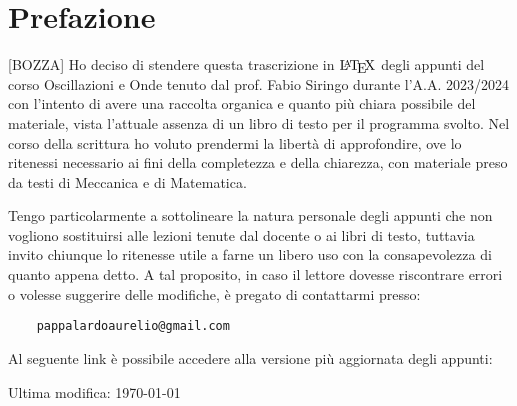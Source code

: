 \chapter*{Prefazione}\label{s:preface}
[BOZZA] Ho deciso di stendere questa trascrizione in $\text{\LaTeX}$ degli appunti del corso Oscillazioni e Onde tenuto dal prof. Fabio Siringo durante l'A.A. 2023/2024 con l'intento di avere una raccolta organica e quanto pi\`u chiara possibile del materiale, vista l'attuale assenza di un libro di testo per il programma svolto. Nel corso della scrittura ho voluto prendermi la libert\`a di approfondire, ove lo ritenessi necessario ai fini della completezza e della chiarezza, con materiale preso da testi di Meccanica e di Matematica. \par Tengo particolarmente a sottolineare la natura personale degli appunti che non vogliono sostituirsi alle lezioni tenute dal docente o ai libri di testo, tuttavia invito chiunque lo ritenesse utile a farne un libero uso con la consapevolezza di quanto appena detto. A tal proposito, in caso il lettore dovesse riscontrare errori o volesse suggerire delle modifiche, \`e pregato di contattarmi presso:
\begin{verbatim}
    pappalardoaurelio@gmail.com
\end{verbatim}\par
Al seguente link è possibile accedere alla versione più aggiornata degli appunti: 

\begin{center}
    Ultima modifica: \today
\end{center}

